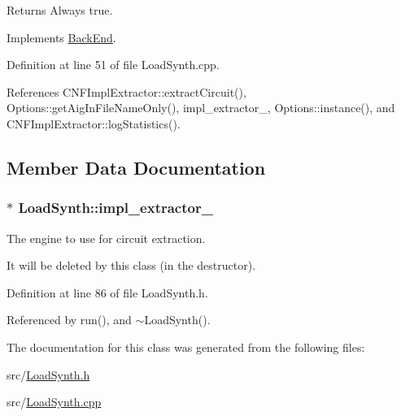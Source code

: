 \begin{DoxyReturn}{Returns}
Always true. 
\end{DoxyReturn}


Implements \hyperlink{classBackEnd_a099e717dc71e9cc2d838b1ca86340590}{Back\-End}.



Definition at line 51 of file Load\-Synth.\-cpp.



References C\-N\-F\-Impl\-Extractor\-::extract\-Circuit(), Options\-::get\-Aig\-In\-File\-Name\-Only(), impl\-\_\-extractor\-\_\-, Options\-::instance(), and C\-N\-F\-Impl\-Extractor\-::log\-Statistics().



\subsection{Member Data Documentation}
\hypertarget{classLoadSynth_aadb78c2e1fec1038d1a2f850a2c984f2}{
\subsubsection[{impl\-\_\-extractor\-\_\-}]{$\ast$ Load\-Synth\-::impl\-\_\-extractor\-\_\-\hspace{0.3cm}{\ttfamily [protected]}}}\label{classLoadSynth_aadb78c2e1fec1038d1a2f850a2c984f2}


The engine to use for circuit extraction. 

It will be deleted by this class (in the destructor). 

Definition at line 86 of file Load\-Synth.\-h.



Referenced by run(), and $\sim$\-Load\-Synth().



The documentation for this class was generated from the following files\-:\begin{DoxyCompactItemize}
\item 
src/\hyperlink{LoadSynth_8h}{Load\-Synth.\-h}\item 
src/\hyperlink{LoadSynth_8cpp}{Load\-Synth.\-cpp}\end{DoxyCompactItemize}
